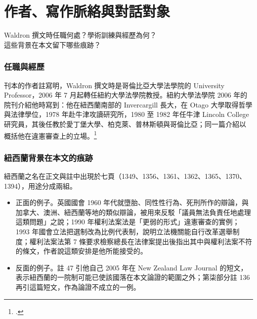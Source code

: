 \chapter{作者、寫作脈絡與對話對象}


\begin{qaquestion}
Waldron 撰文時任職何處？學術訓練與經歷為何？\\
這些背景在本文留下哪些痕跡？
\end{qaquestion}

\subsection{任職與經歷}

刊本的作者註寫明，Waldron 撰文時是哥倫比亞大學法學院的 University Professor，2006 年 7 月起轉任紐約大學法學院教授。紐約大學法學院 2006 年的院刊介紹他時寫到：他在紐西蘭南部的 Invercargill 長大，在 Otago 大學取得哲學與法律學位，1978 年赴牛津攻讀研究所，1980 至 1982 年任牛津 Lincoln College 研究員，其後任教於愛丁堡大學、柏克萊、普林斯頓與哥倫比亞；同一篇介紹以  概括他在違憲審查上的立場。\footcite{nyumag2006}

\subsection{紐西蘭背景在本文的痕跡}

紐西蘭之名在正文與註中出現於七頁（1349、1356、1361、1362、1365、1370、1394），用途分成兩組。

\begin{itemize}
\item 正面的例子。英國國會 1960 年代就墮胎、同性性行為、死刑所作的辯論，與加拿大、澳洲、紐西蘭等地的類似辯論，被用來反駁「議員無法負責任地處理這類問題」之說；1990 年權利法案法是「更弱的形式」違憲審查的實例；1993 年國會立法把選制改為比例代表制，說明立法機關能自行改革選舉制度；權利法案法第 7 條要求檢察總長在法律案提出後指出其中與權利法案不符的條文，作者說這類安排是他所能接受的。
\item 反面的例子。註 47 引他自己 2005 年在 New Zealand Law Journal 的短文，表示紐西蘭的一院制可能已使該國落在本文論證的範圍之外；第柒部分註 136 再引這篇短文，作為論證不成立的一例。
\end{itemize}

